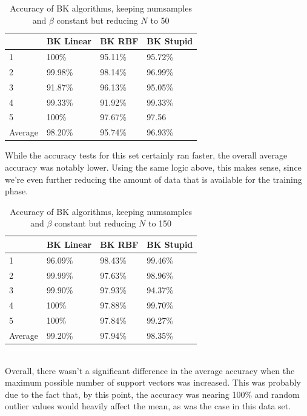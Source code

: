 \documentclass[submit]{harvardml}
\begin{document}
\begin{table}[hbt]
\centering
\caption{Accuracy of BK algorithms, keeping numsamples and $\beta$ constant but reducing $N$ to 50}
\label{my-label}
\begin{tabular}{l|lll}
        & BK Linear & BK RBF  & BK Stupid \\ \hline
1       & 100\%     & 95.11\% & 95.72\%   \\
2       & 99.98\%   & 98.14\% & 96.99\%   \\
3       & 91.87\%   & 96.13\% & 95.05\%   \\
4       & 99.33\%   & 91.92\% & 99.33\%   \\
5       & 100\%     & 97.67\% & 97.56     \\ \hline
Average & 98.20\%   & 95.74\% & 96.93\%  
\end{tabular}
\end{table}
\noindent While the accuracy tests for this set certainly ran faster, the overall average accuracy was notably lower. Using the same logic above, this makes sense, since we're even further reducing the amount of data that is available for the training phase. 
\begin{table}[hbt]
\centering
\caption{Accuracy of BK algorithms, keeping numsamples and $\beta$ constant but reducing $N$ to 150}
\label{my-label}
\begin{tabular}{l|lll}
        & BK Linear & BK RBF  & BK Stupid \\ \hline
1       & 96.09\%   & 98.43\% & 99.46\%   \\
2       & 99.99\%   & 97.63\% & 98.96\%   \\
3       & 99.90\%   & 97.93\% & 94.37\%   \\
4       & 100\%     & 97.88\% & 99.70\%   \\
5       & 100\%     & 97.84\% & 99.27\%   \\ \hline
Average & 99.20\%   & 97.94\% & 98.35\%  
\end{tabular}
\end{table} \\
\noindent Overall, there wasn't a significant difference in the average accuracy when the maximum possible number of support vectors was increased. This was probably due to the fact that, by this point, the accuracy was nearing 100\% and random outlier values would heavily affect the mean, as was the case in this data set. \\ \\ \\\\ 
\end{document}
